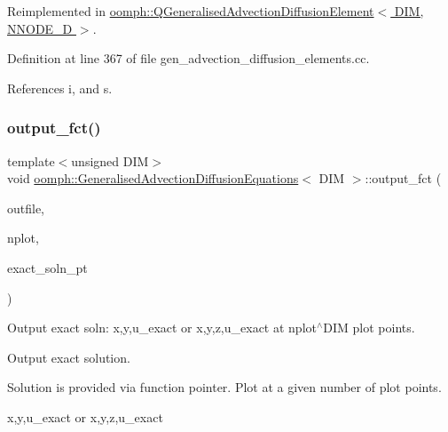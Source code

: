 Reimplemented in \hyperlink{classoomph_1_1QGeneralisedAdvectionDiffusionElement_a40f61af18b55e3570fec3ea7e11c7127}{oomph\+::\+Q\+Generalised\+Advection\+Diffusion\+Element$<$ D\+I\+M, N\+N\+O\+D\+E\+\_\+D $>$}.



Definition at line 367 of file gen\+\_\+advection\+\_\+diffusion\+\_\+elements.\+cc.



References i, and s.

\mbox{\label{classoomph_1_1GeneralisedAdvectionDiffusionEquations_ac7bae95f78ecec53436902a7da1f6a92}} 
\subsubsection{\texorpdfstring{output\+\_\+fct()}{output\_fct()}\hspace{0.1cm}{\footnotesize\ttfamily [1/2]}}
{\footnotesize\ttfamily template$<$unsigned D\+IM$>$ \\
void \hyperlink{classoomph_1_1GeneralisedAdvectionDiffusionEquations}{oomph\+::\+Generalised\+Advection\+Diffusion\+Equations}$<$ D\+IM $>$\+::output\+\_\+fct (\begin{DoxyParamCaption}\item[{std\+::ostream \&}]{outfile,  }\item[{const unsigned \&}]{nplot,  }\item[{\hyperlink{classoomph_1_1FiniteElement_a690fd33af26cc3e84f39bba6d5a85202}{Finite\+Element\+::\+Steady\+Exact\+Solution\+Fct\+Pt}}]{exact\+\_\+soln\+\_\+pt }\end{DoxyParamCaption})\hspace{0.3cm}{\ttfamily [virtual]}}



Output exact soln\+: x,y,u\+\_\+exact or x,y,z,u\+\_\+exact at nplot$^\wedge$\+D\+IM plot points. 

Output exact solution.

Solution is provided via function pointer. Plot at a given number of plot points.

x,y,u\+\_\+exact or x,y,z,u\+\_\+exact 

